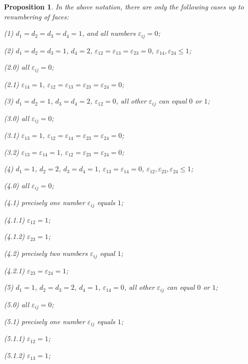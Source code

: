 \documentclass[14pt]{article}
\newtheorem{proposition}{\indent Proposition}[section]
\begin{document}
\begin{proposition}\label{per-sluch}
In the above notation, there are only
 the following cases up to renumbering of faces:

(1) $d_1 = d_2 = d_3 = d_4 = 1$,  and all numbers $\varepsilon_{ij} = 0$;

(2) $d_1 = d_2 = d_3 =  1$, $d_4 = 2$, $\varepsilon_{12}
= \varepsilon_{13} =\varepsilon_{23} = 0$,
$\varepsilon_{14}, \varepsilon_{24} \le 1$;

\hskip 0.5cm (2.0) all $\varepsilon_{ij} = 0$;

\hskip 0.5cm (2.1) $\varepsilon_{14} = 1$, $\varepsilon_{12}
= \varepsilon_{13} =\varepsilon_{23} =
\varepsilon_{24}= 0$;

(3) $d_1 = d_2 = 1$, $d_3 = d_4 = 2$, $\varepsilon_{12} = 0$,
all other $\varepsilon_{ij}$ can equal $0$ or $1$;

\hskip 0.5cm (3.0) all $\varepsilon_{ij} = 0$;


\hskip 0.5cm (3.1)  $\varepsilon_{13} = 1$, $\varepsilon_{12}
= \varepsilon_{14} =\varepsilon_{23} =
\varepsilon_{24}= 0$;


\hskip 0.5cm (3.2)  $\varepsilon_{13} = \varepsilon_{14} = 1$,
$\varepsilon_{12}  =\varepsilon_{23} =
\varepsilon_{24}= 0$;


(4) $d_1 = 1$, $d_2 =  2$,  $d_3 = d_4 = 1$, $\varepsilon_{13}
= \varepsilon_{14} =
0$, $\varepsilon_{12}, \varepsilon_{23},  \varepsilon_{24} \le 1$;

\hskip 0.5cm (4.0) all $\varepsilon_{ij} = 0$;

\hskip 0.5cm (4.1) precisely one number  $\varepsilon_{ij}$ equals $1$;

\hskip 1cm (4.1.1)  $\varepsilon_{12} = 1$;

\hskip 1cm (4.1.2)  $\varepsilon_{23} = 1$;

\hskip 0.5cm (4.2) precisely two numbers  $\varepsilon_{ij}$ equal $1$;

\hskip 1cm (4.2.1)  $\varepsilon_{23} = \varepsilon_{24} = 1$;

(5) $d_1 = 1$, $d_2 = d_3 = 2$,  $d_4 = 1$, $\varepsilon_{14} = 0$,
all other $\varepsilon_{ij}$ can equal  $0$ or $1$;

\hskip 0.5cm (5.0) all $\varepsilon_{ij} = 0$;

\hskip 0.5cm (5.1) precisely one number  $\varepsilon_{ij}$ equals $1$;

\hskip 1cm (5.1.1)  $\varepsilon_{12} = 1$;

\hskip 1cm (5.1.2)  $\varepsilon_{13} = 1$;


\end{proposition}
\end{document}
